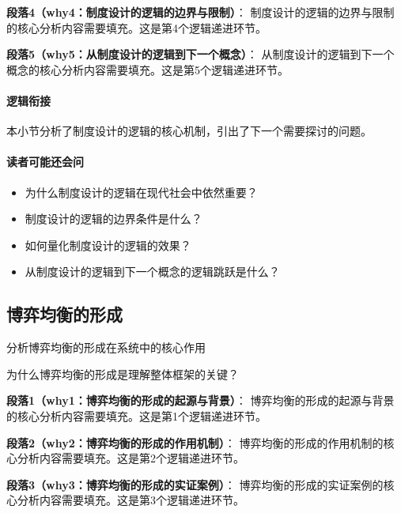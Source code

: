 \documentclass[../main.tex]{subfiles}
\begin{document}
{{\textbf{段落4（why4：制度设计的逻辑的边界与限制）}：
制度设计的逻辑的边界与限制的核心分析内容需要填充。这是第4个逻辑递进环节。


\textbf{段落5（why5：从制度设计的逻辑到下一个概念）}：
从制度设计的逻辑到下一个概念的核心分析内容需要填充。这是第5个逻辑递进环节。


\paragraph*{逻辑衔接}
本小节分析了制度设计的逻辑的核心机制，引出了下一个需要探讨的问题。

\paragraph*{读者可能还会问}
\begin{itemize}
\item 为什么制度设计的逻辑在现代社会中依然重要？
\item 制度设计的逻辑的边界条件是什么？
\item 如何量化制度设计的逻辑的效果？
\item 从制度设计的逻辑到下一个概念的逻辑跳跃是什么？
\end{itemize}


\subsection{博弈均衡的形成}

\begin{motivation}
分析博弈均衡的形成在系统中的核心作用
\end{motivation}

\begin{logicmap}
[逻辑链占位]
\end{logicmap}

\begin{questionbox}
为什么博弈均衡的形成是理解整体框架的关键？
\end{questionbox}

\textbf{段落1（why1：博弈均衡的形成的起源与背景）}：
博弈均衡的形成的起源与背景的核心分析内容需要填充。这是第1个逻辑递进环节。


\textbf{段落2（why2：博弈均衡的形成的作用机制）}：
博弈均衡的形成的作用机制的核心分析内容需要填充。这是第2个逻辑递进环节。


\textbf{段落3（why3：博弈均衡的形成的实证案例）}：
博弈均衡的形成的实证案例的核心分析内容需要填充。这是第3个逻辑递进环节。


}}
\end{document}
